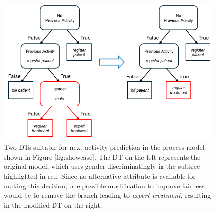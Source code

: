 \begin{figure}[h!]
    \centering
    \includegraphics[width=\textwidth]{gfx/modification.png}
    \caption{Two DTs suitable for next activity prediction in the process model shown in Figure \ref{fig:showcase}.
    The DT on the left represents the original model, which uses gender discriminatingly in the subtree highlighted in red.
    Since no alternative attribute is available for making this decision,
    one possible modification to improve fairness would be to remove the branch leading to \textit{expert treatment},
    resulting in the modified DT on the right.
    }
    \label{fig:modification}
\end{figure}

